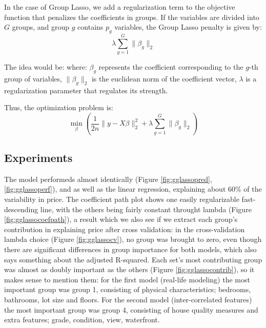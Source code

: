 \documentclass[a4paper, 11pt]{article}
\begin{document}
\begin{multicols}{2}
In the case of Group Lasso, we add a regularization term to the objective function that penalizes the coefficients in groups. If the variables are divided into $G$ groups, and group $g$ contains $p_{g}$ variables, the Group Lasso penalty is given by: \begin{equation} \lambda \sum_{g=1}^{G}\lVert \beta_{g} \rVert_{2}
\end{equation}

The idea would be: where: $\beta_g$ represents the coefficient corresponding to the $g$-th group of variables, $\lVert \beta_g \rVert_2$ is the euclidean norm of the coefficient vector, $\lambda$ is a regularization parameter that regulates its strength.

Thus, the optimization problem is: \begin{equation}
\min_{\beta}\left (\frac{1}{2n}\lVert y-X\beta\rVert^{2}_{2} + \lambda \sum_{g=1}^{G}\lVert \beta_{g} \rVert_{2}\right)
\end{equation}

\subsection{Experiments} \vspace{-3pt}
The model performeds almost identically (Figure \ref{fig:gglassopred}, \ref{fig:gglassoperf}), and as well as the linear regression, explaining about 60\% of the variability in price. The coefficient path plot shows one easily regularizable fast-descending line, with the others being fairly constant throught lambda (Figure \ref{fig:gglassocoefpath}), a result which we also see if we extract each group's contribution in explaining price after cross validation: in the cross-validation lambda choice (Figure \ref{fig:gglassocv}), no group was brought to zero, even though there are significant differences in group importance for both models, which also says something about the adjusted R-squared.
Each set's most contributing group was almost as doubly important as the others (Figure \ref{fig:gglassocontrib}), so it makes sense to mention them: for the first model (real-life modeling) the most important group was group 1, consisting of physical characteristics; bedrooms, bathrooms, lot size and floors. For the second model (inter-correlated features) the most important group was group 4, consisting of house quality measures and extra features; grade, condition, view, waterfront.


\end{multicols}
\end{document}
